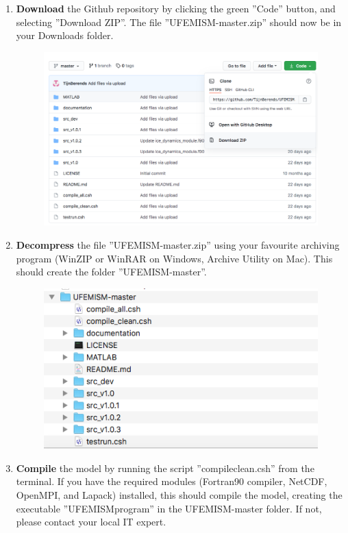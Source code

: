 \documentclass{article}
\begin{document}
\begin{enumerate}
\item \textbf{Download} the Github repository by clicking the green ''Code'' button, and selecting ''Download ZIP''. The file ''UFEMISM-master.zip'' should now be in your Downloads folder.

  \begin{figure}[H]
    \centering
    \includegraphics[width=0.9\linewidth]{Fig_howto_01.png}
  \end{figure}
  
  \item \textbf{Decompress} the file ''UFEMISM-master.zip'' using your favourite archiving program (WinZIP or WinRAR on Windows, Archive Utility on Mac). This should create the folder ''UFEMISM-master''.

  \begin{figure}[H]
    \centering
    \includegraphics[width=0.6\linewidth]{Fig_howto_02.png}
  \end{figure}
  
  \item \textbf{Compile} the model by running the script ''compile\textunderscore clean.csh'' from the terminal. If you have the required modules (Fortran90 compiler, NetCDF, OpenMPI, and Lapack) installed, this should compile the model, creating the executable ''UFEMISM\textunderscore program'' in the UFEMISM-master folder. If not, please contact your local IT expert.


\end{enumerate}
\end{document}

